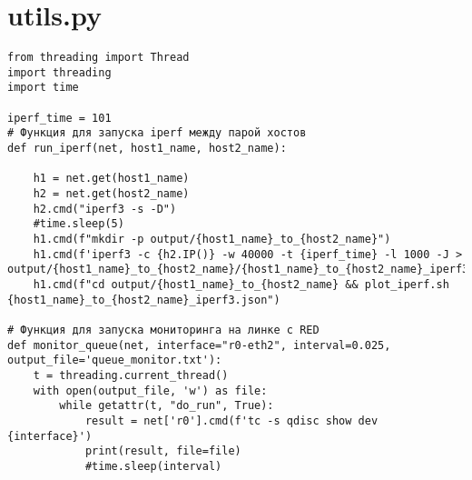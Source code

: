 \section*{utils.py}
\begin{verbatim}
from threading import Thread
import threading
import time

iperf_time = 101
# Функция для запуска iperf между парой хостов
def run_iperf(net, host1_name, host2_name):
    
    h1 = net.get(host1_name)
    h2 = net.get(host2_name)
    h2.cmd("iperf3 -s -D")
    #time.sleep(5)
    h1.cmd(f"mkdir -p output/{host1_name}_to_{host2_name}")
    h1.cmd(f'iperf3 -c {h2.IP()} -w 40000 -t {iperf_time} -l 1000 -J > output/{host1_name}_to_{host2_name}/{host1_name}_to_{host2_name}_iperf3.json')
    h1.cmd(f"cd output/{host1_name}_to_{host2_name} && plot_iperf.sh {host1_name}_to_{host2_name}_iperf3.json")
    
# Функция для запуска мониторинга на линке с RED
def monitor_queue(net, interface="r0-eth2", interval=0.025, output_file='queue_monitor.txt'):
    t = threading.current_thread()
    with open(output_file, 'w') as file:
        while getattr(t, "do_run", True):
            result = net['r0'].cmd(f'tc -s qdisc show dev {interface}')
            print(result, file=file)
            #time.sleep(interval)

\end{verbatim}

